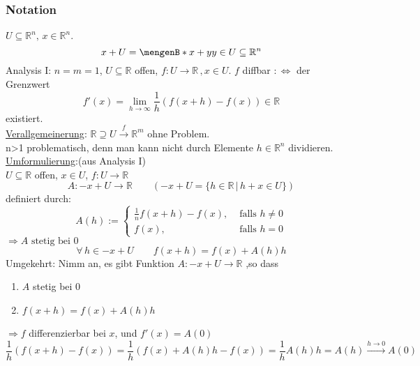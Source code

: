 \subsubsection{Notation} %
\label{ssub:notation}
$U \subseteq \mathbb{R}^n, \, x \in \mathbb{R}^n$.
\[
	x+U = \set[x+y]{y \in U} \subseteq \mathbb{R}^n
\]
Analysis I: $n=m=1$, $U \subseteq \mathbb{R}$ offen, $f: U \to \mathbb{R} \,, x \in U$. $f$ diffbar $:\Leftrightarrow$ der Grenzwert
\[
	f'(x)= \lim_{h \to \infty} \frac{1}{h}(f(x+h)-f(x)) \in \mathbb{R}
\]
existiert. \\
\underline{Verallgemeinerung}: $\mathbb{R} \supseteq U \stackrel{f}{\to} \mathbb{R}^m$ ohne Problem. \\
n>1 problematisch, denn man kann nicht durch Elemente $h \in \mathbb{R}^n$ dividieren. \\
\underline{Umformulierung}:(aus Analysis I) \\
$U \subseteq \mathbb{R}$ offen, $x \in U$, $f: U \to \mathbb{R}$ 
\[
	A: -x+U \to \mathbb{R}  \qquad ( -x+U=\{h \in \mathbb{R}\,|\,h+x \in U \} )
\]
definiert durch:
\[
	A(h):= \begin{cases}
		\frac{1}{n}f(x+h)-f(x), &\text{ falls }h \neq 0\\
		f(x), &\text{ falls }h=0
		\end{cases}
\]
$\Rightarrow A \text{ stetig bei }0$
\[
	\forall\, h \in -x+U \qquad f(x+h)=f(x)+A(h)h
\]
Umgekehrt: Nimm an, es gibt Funktion $A:-x+U \to \mathbb{R}$ ,so dass 
\begin{enumerate}
	\item $A$ stetig bei $0$
	\item $f(x+h)=f(x)+A(h)h$
\end{enumerate}
$\Rightarrow f$ differenzierbar bei $x$, und $f'(x)=A(0)$
\[
	\frac{1}{h}(f(x+h)-f(x))=\frac{1}{h}(f(x)+A(h)h-f(x))= \frac{1}{h}A(h)h = A(h) \stackrel{h \to 0}{\longrightarrow} A(0)
\]

